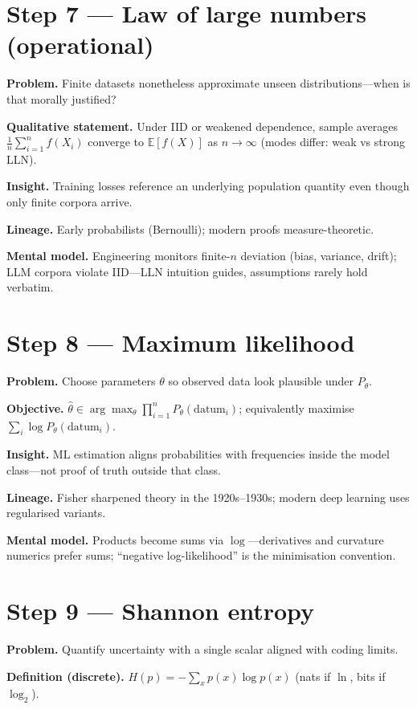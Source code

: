 \section*{Step 7 --- Law of large numbers (operational)}
\textbf{Problem.} Finite datasets nonetheless approximate unseen distributions---when is that morally justified?

\textbf{Qualitative statement.} Under IID or weakened dependence, sample averages $\frac{1}{n}\sum_{i=1}^n f(X_i)$ converge to $\mathbb{E}[f(X)]$ as $n\to\infty$ (modes differ: weak vs strong LLN).

\textbf{Insight.} Training losses reference an underlying population quantity even though only finite corpora arrive.

\textbf{Lineage.} Early probabilists (Bernoulli); modern proofs measure-theoretic.

\textbf{Mental model.} Engineering monitors finite-$n$ deviation (bias, variance, drift); LLM corpora violate IID---LLN intuition guides, assumptions rarely hold verbatim.

\section*{Step 8 --- Maximum likelihood}
\textbf{Problem.} Choose parameters $\theta$ so observed data look plausible under $P_\theta$.

\textbf{Objective.} $\hat\theta\in \arg\max_\theta \prod_{i=1}^n P_\theta(\text{datum}_i)$; equivalently maximise $\sum_i \log P_\theta(\text{datum}_i)$.

\textbf{Insight.} ML estimation aligns probabilities with frequencies inside the model class---not proof of truth outside that class.

\textbf{Lineage.} Fisher sharpened theory in the 1920s--1930s; modern deep learning uses regularised variants.

\textbf{Mental model.} Products become sums via $\log$---derivatives and curvature numerics prefer sums; ``negative log-likelihood'' is the minimisation convention.

\section*{Step 9 --- Shannon entropy}
\textbf{Problem.} Quantify uncertainty with a single scalar aligned with coding limits.

\textbf{Definition (discrete).} $H(p)=-\sum_x p(x)\log p(x)$ (nats if $\ln$, bits if $\log_2$).


